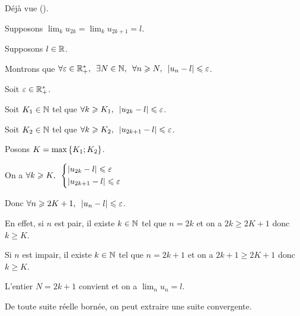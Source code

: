 \begin{dem}
\impdir Déjà vue ().

\imprec

Supposons \(\lim_ku_{2k}=\lim_ku_{2k+1}=l\).

Supposons \(l\in\mathbb{R}\).

Montrons que \(\quantifs{\forall\epsilon\in\Rps;\exists N\in\N;\forall n\geq N}\abs{u_n-l}\leq\epsilon\).

Soit \(\varepsilon\in\mathbb{R}_+^*\).

Soit \(K_1\in\mathbb{N}\) tel que \(\quantifs{\forall k\geq K_1}\abs{u_{2k}-l}\leq\epsilon\).

Soit \(K_2\in\mathbb{N}\) tel que \(\quantifs{\forall k\geq K_2}\abs{u_{2k+1}-l}\leq\epsilon\).

Posons \(K=\max\left\lbrace K_1;K_2\right\rbrace\).

On a \(\quantifs{\forall k\geq K}\begin{dcases}\abs{u_{2k}-l}\leq\epsilon \\ \abs{u_{2k+1}-l}\leq\epsilon\end{dcases}\)

Donc \(\quantifs{\forall n\geq 2K+1}\abs{u_n-l}\leq\epsilon\).

En effet, si \(n\) est pair, il existe \(k\in\mathbb{N}\) tel que \(n=2k\) et on a \(2k\geq 2K+1\) donc \(k\geq K\).

Si \(n\) est impair, il existe \(k\in\mathbb{N}\) tel que \(n=2k+1\) et on a \(2k+1\geq 2K+1\) donc \(k\geq K\).

L'entier \(N=2k+1\) convient et on a \(\lim_nu_n=l\).
\end{dem}

\begin{theo}
De toute suite réelle bornée, on peut extraire une suite convergente.
\end{theo}


